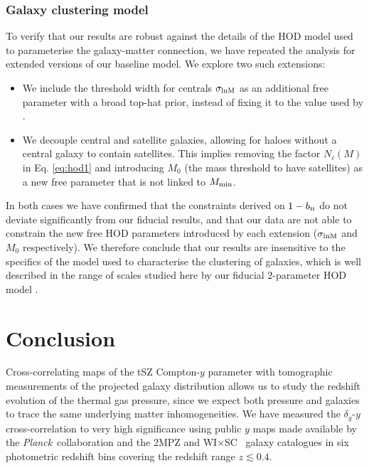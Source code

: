 \documentclass[useAMS,usenatbib]{mn2e}
\newcommand{\wisc}{WI$\times$SC}
\def\bH{b_{\scriptscriptstyle\rm H}}
\def\planck{{\it Planck\/}}
\begin{document}
    \subsubsection{Galaxy clustering model}\label{sssec:results.syst.gc}
      To verify that our results are robust against the details of the HOD model used to parameterise the galaxy-matter connection, we have repeated the analysis for extended versions of our baseline model. We explore two such extensions:
      \begin{itemize}
        \item We include the threshold width for centrals $\sigma_{\rm lnM}$ as an additional free parameter with a broad top-hat prior, instead of fixing it to the value used by \cite{2018MNRAS.473.4318A}.
        \item We decouple central and satellite galaxies, allowing for haloes without a central galaxy to contain satellites. This implies removing the factor $N_c(M)$ in Eq. \ref{eq:hod1} and introducing $M_0$ (the mass threshold to have satellites) as a new free parameter that is not linked to $M_{\rm min}$.
      \end{itemize}
      In both cases we have confirmed that the constraints derived on $1-\bH$ do not deviate significantly from our fiducial results, and that our data are not able to constrain the new free HOD parameters introduced by each extension ($\sigma_{\rm lnM}$ and $M_0$ respectively). We therefore conclude that our results are insensitive to the specifics of the model used to characterise the clustering of galaxies, which is well described in the range of scales studied here by our fiducial 2-parameter HOD model .

      
\section{Conclusion}\label{sec:conclusion}
  Cross-correlating maps of the tSZ Compton-$y$ parameter with tomographic measurements of the projected galaxy distribution allows us to study the redshift evolution of the thermal gas pressure, since we expect both pressure and galaxies to trace the same underlying matter inhomogeneities. We have measured the $\delta_g$-$y$ cross-correlation to very high significance using public $y$ maps made available by the \planck\ collaboration \citep{2016A&A...594A..22P} and the 2MPZ and \wisc~ galaxy catalogues \citep{2014ApJS..210....9B,2016ApJS..225....5B} in six photometric redshift bins covering the redshift range $z\lesssim0.4$.
  
\end{document}
